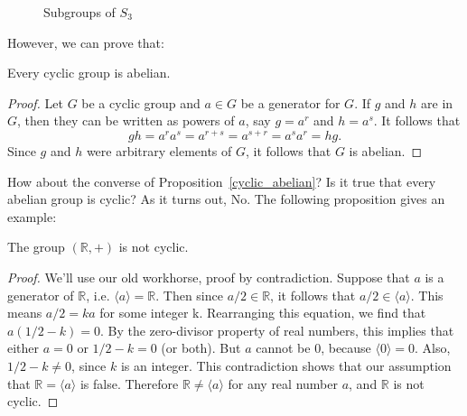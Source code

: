 \begin{figure}[htb] %
\begin{center}
\end{center}
\caption{Subgroups of $S_3$}
\label{subgrpsS3}
\end{figure}
 
\noindent
However, we can prove that:
 
\begin{thmprop}\label{cyclic_abelian}
Every cyclic group is abelian.
\end{thmprop}
 
 
\begin{proof}
Let $G$ be a cyclic group and $a \in G$ be a generator for $G$. If
$g$ and $h$ are in $G$, then they can be written as powers of $a$,
say $g = a^r$ and $h = a^s$. It follows that
\[
g  h = a^r a^s = a^{r+s} = a^{s+r} = a^s a^r = h g.
\]
Since $g$ and $h$ were arbitrary elements of $G$, it follows that $G$ is abelian.
\end{proof}
 
How about the converse of Proposition~\ref{cyclic_abelian}? Is it true that every abelian group is cyclic? As it turns out, No. The following proposition gives an example:

\begin{thmprop}\label{realNotCyclic}
The group $({\mathbb R},+)$ is not cyclic.
\end{thmprop}

\begin{proof}
We'll use our old workhorse, proof by contradiction.  Suppose that $a$ is a generator of $\mathbb{R}$, i.e. $\langle a \rangle = \mathbb{R}$.  Then since $a/2 \in  \mathbb{R}$, it follows that  $a/2 \in \langle a \rangle$. This means $a/2 =ka$ for some integer k.  Rearranging this equation, we find that $a(1/2-k)=0$.  By the zero-divisor property of real numbers, this implies that either $a=0$ or $1/2-k = 0$ (or both). But $a$ cannot be 0, because $\langle 0 \rangle = 0$.  Also, $1/2-k \neq 0$, since $k$ is an integer.  This contradiction shows that  our assumption that ${\mathbb R} = \langle a \rangle$ is false. Therefore ${\mathbb R} \neq \langle a \rangle$ for any real number $a$, and ${\mathbb R}$ is not cyclic.
\end{proof}

